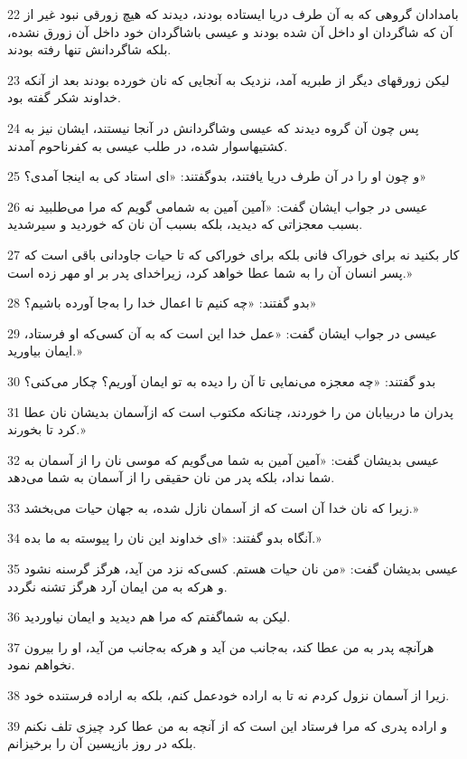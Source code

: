 \par 22 بامدادان گروهی که به آن طرف دریا ایستاده بودند، دیدند که هیچ زورقی نبود غیر از آن که شاگردان او داخل آن شده بودند و عیسی باشاگردان خود داخل آن زورق نشده، بلکه شاگردانش تنها رفته بودند.
\par 23 لیکن زورقهای دیگر از طبریه آمد، نزدیک به آنجایی که نان خورده بودند بعد از آنکه خداوند شکر گفته بود.
\par 24 پس چون آن گروه دیدند که عیسی وشاگردانش در آنجا نیستند، ایشان نیز به کشتیهاسوار شده، در طلب عیسی به کفرناحوم آمدند.
\par 25 و چون او را در آن طرف دریا یافتند، بدوگفتند: «ای استاد کی به اینجا آمدی؟»
\par 26 عیسی در جواب ایشان گفت: «آمین آمین به شمامی گویم که مرا می‌طلبید نه بسبب معجزاتی که دیدید، بلکه بسبب آن نان که خوردید و سیرشدید.
\par 27 کار بکنید نه برای خوراک فانی بلکه برای خوراکی که تا حیات جاودانی باقی است که پسر انسان آن را به شما عطا خواهد کرد، زیراخدای پدر بر او مهر زده است.»
\par 28 بدو گفتند: «چه کنیم تا اعمال خدا را به‌جا آورده باشیم؟»
\par 29 عیسی در جواب ایشان گفت: «عمل خدا این است که به آن کسی‌که او فرستاد، ایمان بیاورید.»
\par 30 بدو گفتند: «چه معجزه می‌نمایی تا آن را دیده به تو ایمان آوریم؟ چکار می‌کنی؟
\par 31 پدران ما دربیابان من را خوردند، چنانکه مکتوب است که ازآسمان بدیشان نان عطا کرد تا بخورند.»
\par 32 عیسی بدیشان گفت: «آمین آمین به شما می‌گویم که موسی نان را از آسمان به شما نداد، بلکه پدر من نان حقیقی را از آسمان به شما می‌دهد.
\par 33 زیرا که نان خدا آن است که از آسمان نازل شده، به جهان حیات می‌بخشد.»
\par 34 آنگاه بدو گفتند: «ای خداوند این نان را پیوسته به ما بده.»
\par 35 عیسی بدیشان گفت: «من نان حیات هستم. کسی‌که نزد من آید، هرگز گرسنه نشود و هر‌که به من ایمان آرد هرگز تشنه نگردد.
\par 36 لیکن به شماگفتم که مرا هم دیدید و ایمان نیاوردید.
\par 37 هرآنچه پدر به من عطا کند، به‌جانب من آید و هر‌که به‌جانب من آید، او را بیرون نخواهم نمود.
\par 38 زیرا از آسمان نزول کردم نه تا به اراده خودعمل کنم، بلکه به اراده فرستنده خود.
\par 39 و اراده پدری که مرا فرستاد این است که از آنچه به من عطا کرد چیزی تلف نکنم بلکه در روز بازپسین آن را برخیزانم.
